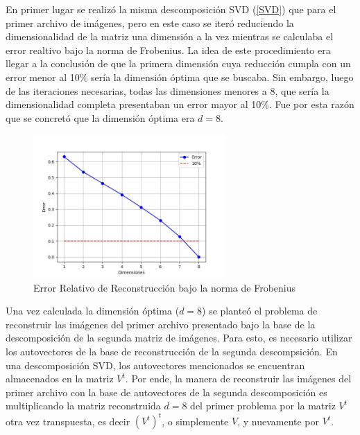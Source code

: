 \documentclass[12pt,a4]{article} %
\begin{document}
En primer lugar se realizó la misma descomposición SVD (\ref{SVD}) que para el primer archivo de imágenes, pero en este caso se iteró reduciendo la dimensionalidad de la matriz una dimensión a la vez mientras se calculaba el error realtivo bajo la norma de Frobenius. La idea de este procedimiento era llegar a la conclusión de que la primera dimensión cuya reducción cumpla con un error menor al 10\% sería la dimensión óptima que se buscaba. Sin embargo, luego de las iteraciones necesarias, todas las dimensiones menores a 8, que sería la dimensionalidad completa presentaban un error mayor al 10\%. Fue por esta razón que se concretó que la dimensión óptima era $d = 8$.

\begin{figure}[H]
    \centering
    \includegraphics[width=0.65\textwidth]{latex_project/Graficos_ej2/error.jpeg}
    \caption{Error Relativo de Reconstrucción bajo la norma de Frobenius}
    \label{fig:error}
\end{figure}

Una vez calculada la dimensión óptima ($d = 8$) se planteó el problema de reconstruir las imágenes del primer archivo presentado bajo la base de la descomposición de la segunda matriz de imágenes. Para esto, es necesario utilizar los autovectores de la base de reconstrucción de la segunda descompsición. En una descomposición SVD, los autovectores mencionados se encuentran almacenados en la matriz $V^{t}$. Por ende, la manera de reconstruir las imágenes del primer archivo con la base de autovectores de la segunda descomposición es multiplicando la matriz reconstruida $d = 8$ del primer problema por la matriz $V^{t}$ otra vez transpuesta, es decir $(V^{t})^{t}$, o simplemente $V$, y nuevamente por $V^{t}$.
\end{document}
